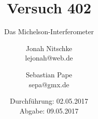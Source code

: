 

\title{Versuch 402}
\subtitle{Das Michelson-Interferometer}
\author{Jonah Nitschke\\
        lejonah@web.de \and
        Sebastian Pape\\
        sepa@gmx.de}
\date{Durchführung: 02.05.2017\\
      Abgabe: 09.05.2017}



\maketitle
\newpage
\setcounter{page}{1}


\newpage


\printbibliography


